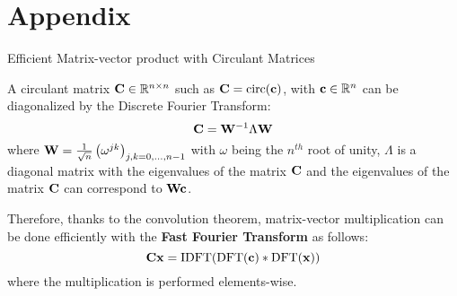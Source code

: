 \section{Appendix}

\begin{frame}{Efficient Matrix-vector product with Circulant Matrices}

  A circulant matrix $\mathbf{C} \in {\ensuremath \mathbb{R}}^{n \times n}$ such as $\mathbf{C} = \mathrm{circ} (\mathbf{c})$, with $\mathbf{c} \in {\ensuremath \mathbb{R}}^n$ can be diagonalized by the Discrete Fourier Transform:
  \begin{equation*}
      \mathbf{C} = \mathbf{W}^{-1} \Lambda \mathbf{W}
  \end{equation*}
  where $\mathbf{W} = \frac{1}{\sqrt{n}} \left( \omega^{jk} \right)_{j,k = 0, \dots, n-1}$ with $\omega$ being the $n^{th}$ root of unity, $\Lambda$ is a diagonal matrix with the eigenvalues of the matrix $\mathbf{C}$ and the eigenvalues of the matrix $\mathbf{C}$ can correspond to $\mathbf{W} \mathbf{c}$. 

  Therefore, thanks to the convolution theorem, matrix-vector multiplication can be done efficiently with the \textbf{Fast Fourier Transform} as follows:
  \begin{equation*}
    \mathbf{C} \mathbf{x} = \mathrm{IDFT}( \mathrm{DFT}(\mathbf{c}) * \mathrm{DFT}(\mathbf{x}) )
  \end{equation*}
  where the multiplication is performed elements-wise. 
\end{frame}

